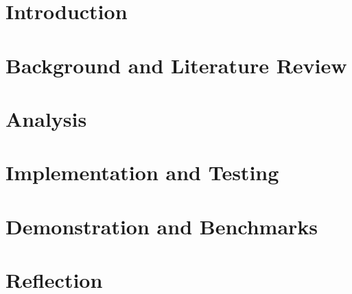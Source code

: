 



% 

\thispagestyle{plain}

\setcounter{secnumdepth}{2} %
\setcounter{tocdepth}{2} %
\tableofcontents*


\chapter{Introduction}


\chapter{Background and Literature Review}





% 
\newpage

\chapter{Analysis}

\newpage

\chapter{Implementation and Testing}






\newpage

\chapter{Demonstration and Benchmarks}


\newpage

\chapter{Reflection}

\newpage

